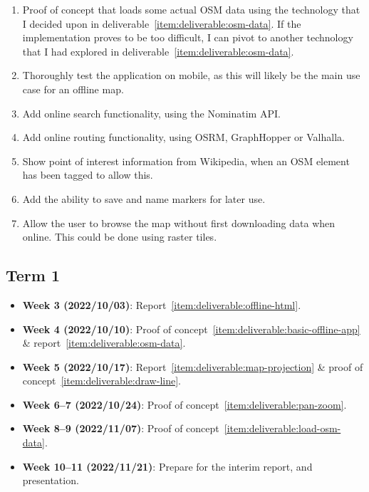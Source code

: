 \documentclass[]{final_report}
\begin{document}
\begin{enumerate}
    \item Proof of concept that loads some actual OSM data using the technology that I decided upon in deliverable~\ref{item:deliverable:osm-data}. If the implementation proves to be too difficult, I can pivot to another technology that I had explored in deliverable~\ref{item:deliverable:osm-data}.\label{item:deliverable:load-osm-data}
    \item Thoroughly test the application on mobile, as this will likely be the main use case for an offline map.\label{item:deliverable:mobile-testing}
    \item Add online search functionality, using the Nominatim API.\label{item:deliverable:search}
    \item Add online routing functionality, using OSRM, GraphHopper or Valhalla.\label{item:deliverable:routing}
    \item Show point of interest information from Wikipedia, when an OSM element has been tagged to allow this.\label{item:deliverable:wikipedia}
    \item Add the ability to save and name markers for later use.\label{item:deliverable:markers}
    \item Allow the user to browse the map without first downloading data when online. This could be done using raster tiles.\label{item:deliverable:online}
\end{enumerate}

\subsection{Term 1}

\begin{itemize}
    \item \textbf{Week 3 (2022/10/03)}: Report~\ref{item:deliverable:offline-html}.
    \item \textbf{Week 4 (2022/10/10)}: Proof of concept~\ref{item:deliverable:basic-offline-app} \& report~\ref{item:deliverable:osm-data}.
    \item \textbf{Week 5 (2022/10/17)}: Report~\ref{item:deliverable:map-projection} \& proof of concept~\ref{item:deliverable:draw-line}.
    \item \textbf{Week 6--7 (2022/10/24)}: Proof of concept~\ref{item:deliverable:pan-zoom}.
    \item \textbf{Week 8--9 (2022/11/07)}: Proof of concept~\ref{item:deliverable:load-osm-data}.
    \item \textbf{Week 10--11 (2022/11/21)}: Prepare for the interim report, and presentation.
\end{itemize}
\end{document}
